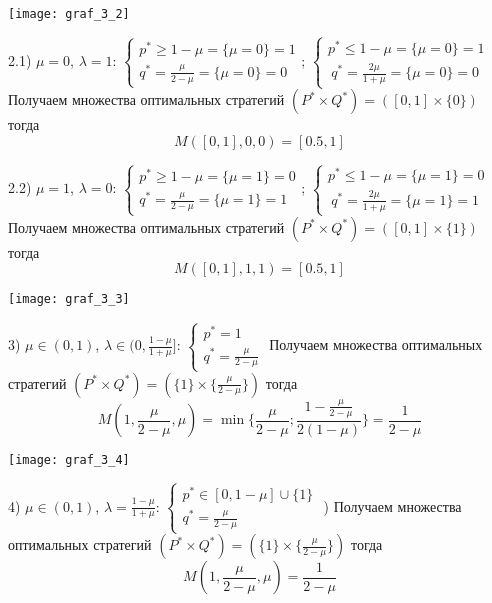 \begin{center}
\texttt{[image: graf\_3\_2]}
\end{center}
2.1) $\mu=0$, $\lambda =1$: 
$\begin{cases}p^{*} \geq 1-\mu = \{\mu=0\}=1
\\ q^{*}=\frac{\mu}{2-\mu} = \{\mu=0\}=0
\end{cases}$;
$\begin{cases}p^{*} \leq 1-\mu = \{\mu=0\}=1\\\
q^{*}=\frac{2\mu}{1+\mu}= \{\mu=0\}=0 \end{cases}$
\hfill \break 
Получаем множества оптимальных стратегий 
$(P^{*} \times Q^{*}) =([0, 1] \times \{0\})$ тогда
$$M([0, 1],0,0)=[0.5,1]$$

2.2) $\mu=1$, $\lambda=0$: 
$\begin{cases}p^{*} \geq 1-\mu = \{\mu=1\}=0
\\ q^{*}=\frac{\mu}{2-\mu} = \{\mu=1\}=1
\end{cases}$;
$\begin{cases}p^{*} \leq 1-\mu = \{\mu=1\}=0\\\
q^{*}=\frac{2\mu}{1+\mu}= \{\mu=1\}=1 \end{cases}$
\hfill \break 
Получаем множества оптимальных стратегий 
$(P^{*} \times Q^{*}) =([0, 1] \times \{1\})$ тогда
$$M([0, 1],1,1)=[0.5,1]$$

\begin{center}
\texttt{[image: graf\_3\_3]}
\end{center}
3) $\mu \in (0,1)$, $\lambda\in(0,\frac{1-\mu}{1+\mu}]$: 
$\begin{cases}p^{*}=1 \\ q^{*}=\frac{\mu}{2-\mu} \end{cases}$
\hfill \break
Получаем множества оптимальных стратегий 
$(P^{*} \times Q^{*}) =(\{1\} \times \{\frac{\mu}{2-\mu}\})$ тогда
$$M(1,\frac{\mu}{2-\mu},\mu)=\min \big\{\frac{\mu}{2-\mu}; 
\frac{1-\frac{\mu}{2-\mu}}{2(1-\mu)}\big\}=\frac{1}{2-\mu}$$

\begin{center}
\texttt{[image: graf\_3\_4]}
\end{center}
4) $\mu \in (0,1)$, $\lambda=\frac{1-\mu}{1+\mu}$:
$\begin{cases}p^{*} \in [0, 1-\mu] \cup \{1\} \\
q^{*} = \frac{\mu}{2-\mu}
\end{cases}$
\hfill {}) Получаем множества оптимальных стратегий 
$(P^{*} \times Q^{*}) =(\{1\} \times \{\frac{\mu}{2-\mu}\})$ тогда
$$M(1,\frac{\mu}{2-\mu},\mu)=\frac{1}{2-\mu}$$

